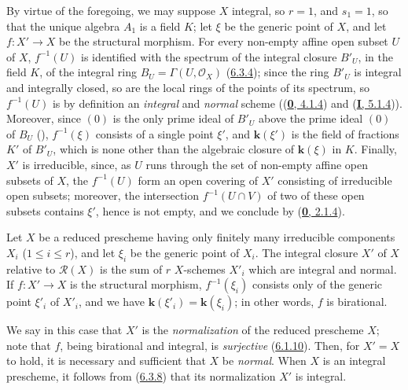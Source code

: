 By virtue of the foregoing, we may suppose $X$ integral, so $r=1$, and
$s_1=1$, so that the unique algebra $A_1$ is a field $K$; let $\xi$ be the
generic point of $X$, and let $f:X'\to X$ be the structural morphism. For
every non-empty affine open subset $U$ of $X$, $f^{-1}(U)$ is identified with
the spectrum of the integral closure $B'_U$, in the field $K$, of the
integral ring $B_U=\Gamma(U,\mathcal{O}_X)$ (\hyperref[II.6.3.4]{6.3.4});
since the ring $B'_U$ is integral and integrally closed, so are the local
rings of the points of its spectrum, so $f^{-1}(U)$ is by definition an
\emph{integral} and \emph{normal} scheme ((\hyperref[0.4.1.4]{\textbf{0}, 4.1.4}) and
(\hyperref[I.5.1.4]{\textbf{I}, 5.1.4})). Moreover, since $(0)$ is the only prime
ideal of $B'_U$ above the prime ideal $(0)$ of $B_U$
(\cite[vol.~I, p.~259]{I-13}), $f^{-1}(\xi)$ consists of a single point
$\xi'$, and $\boldsymbol{k}(\xi')$ is the field of fractions $K'$ of $B'_U$, which is none
other than the algebraic closure of $\boldsymbol{k}(\xi)$ in $K$. Finally, $X'$ is
irreducible, since, as $U$ runs through the set of non-empty affine open
subsets of $X$, the $f^{-1}(U)$ form an open covering of $X'$ consisting of
irreducible open subsets; moreover, the intersection $f^{-1}(U\cap V)$ of
two of these open subsets contains $\xi'$, hence is not empty, and we
conclude by (\hyperref[0.2.1.4]{\textbf{0}, 2.1.4}).

\begin{corollary}[6.3.8]
\label{II.6.3.8}
Let $X$ be a reduced prescheme having only finitely many irreducible
components $X_i$ ($1\leq i\leq r$), and let $\xi_i$ be the generic point of
$X_i$. The integral closure $X'$ of $X$ relative to $\mathcal{R}(X)$ is the
sum of $r$ $X$-schemes $X'_i$ which are integral and normal. If $f:X'\to X$
is the structural morphism, $f^{-1}(\xi_i)$ consists only of the generic
point $\xi'_i$ of $X'_i$, and we have $\boldsymbol{k}(\xi'_i)=\boldsymbol{k}(\xi_i)$; in other words,
$f$ is birational.
\end{corollary}

We say in this case that $X'$ is the \emph{normalization} of the reduced
prescheme $X$; note that $f$, being birational and integral, is
\emph{surjective} (\hyperref[II.6.1.10]{6.1.10}). Then, for $X'=X$ to
hold, it is necessary and sufficient that $X$ be \emph{normal}. When $X$ is an
integral prescheme, it follows from (\hyperref[II.6.3.8]{6.3.8}) that its
normalization $X'$ is integral.

